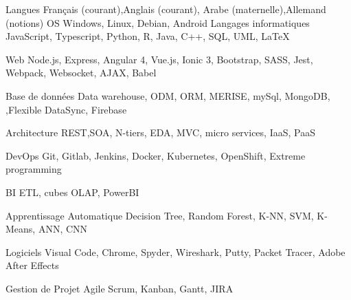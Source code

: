

\begin{cvskills}
  \cvskill
    {Langues } %
    {Français  (courant),Anglais (courant), Arabe (maternelle),Allemand (notions)} %
  \cvskill
    {OS} %
    {Windows, Linux, Debian, Android} %
  \cvskill
    {Langages informatiques} %
    {JavaScript, Typescript, Python, R, Java, C++, SQL, UML, LaTeX} %

  \cvskill
    {Web} %
    {Node.js, Express, Angular 4, Vue.js, Ionic 3, Bootstrap, SASS, Jest, Webpack, Websocket, AJAX, Babel} %

  \cvskill
    {Base de données} %
    {Data warehouse, ODM, ORM, MERISE, mySql, MongoDB, ,Flexible DataSync, Firebase } %

  \cvskill
    {Architecture} %
    {REST,SOA, N-tiers, EDA, MVC, micro services, IaaS, PaaS } %

  \cvskill
    {DevOps} %
    {Git, Gitlab, Jenkins, Docker, Kubernetes, OpenShift, Extreme programming  } %

\cvskill
    {BI} %
    {ETL, cubes OLAP, PowerBI } %


\cvskill
    {Apprentissage Automatique} %
    {Decision Tree, Random Forest, K-NN, SVM, K-Means, ANN, CNN } %

\cvskill
    {Logiciels} %
    {Visual Code, Chrome, Spyder, Wireshark, Putty, Packet Tracer, Adobe After Effects  } %


\cvskill
    {Gestion de Projet} %
    {Agile Scrum, Kanban, Gantt, JIRA } %

\end{cvskills}
